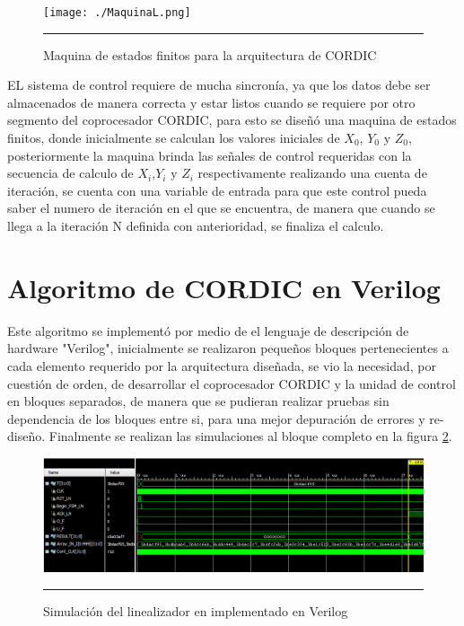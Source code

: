 \begin{figure}[H]
  \centering
    \texttt{[image: ./MaquinaL.png]}
    \rule{35em}{0.5pt}
  \caption[Maquina de estados finitos para la arquitectura de CORDIC]{Maquina de estados finitos para la arquitectura de CORDIC   }
  \label{fig:FSML}
\end{figure}

EL sistema de control requiere de mucha sincronía, ya que los datos debe ser almacenados de manera correcta y estar listos cuando se requiere por otro segmento del coprocesador CORDIC, para esto se diseñó una maquina de estados finitos, donde inicialmente se calculan los valores iniciales de $ X_0 $, $ Y_0 $ y $ Z_0 $, posteriormente la maquina brinda las señales de control requeridas con la secuencia de calculo de $ X_i $,$ Y_i $ y $ Z_i $ respectivamente realizando una cuenta de iteración, se cuenta con una variable de entrada para que este control pueda saber el numero de iteración en el que se encuentra, de manera que cuando se llega a la iteración N definida con anterioridad, se finaliza el calculo.

\section{Algoritmo de CORDIC en Verilog}

Este algoritmo se implementó por medio de el lenguaje de descripción de hardware "Verilog", inicialmente se realizaron pequeños bloques pertenecientes a cada elemento requerido por la arquitectura diseñada, se vio la necesidad, por cuestión de orden, de desarrollar el coprocesador CORDIC y la unidad de control en bloques separados, de manera que se pudieran realizar pruebas sin dependencia de los bloques entre si, para una mejor depuración de errores y re-diseño. Finalmente se realizan las simulaciones al bloque completo en la figura \ref{fig:SIMLINEAL}. 

\begin{figure}[H]
  \centering
    \includegraphics[scale=0.6]{./TEST_LINEALIZADOR_I.png}
    \rule{35em}{0.5pt}
  \caption[Simulación del linealizador en implementado en Verilog]{Simulación del linealizador en implementado en Verilog}
  \label{fig:SIMLINEAL}
\end{figure}   


